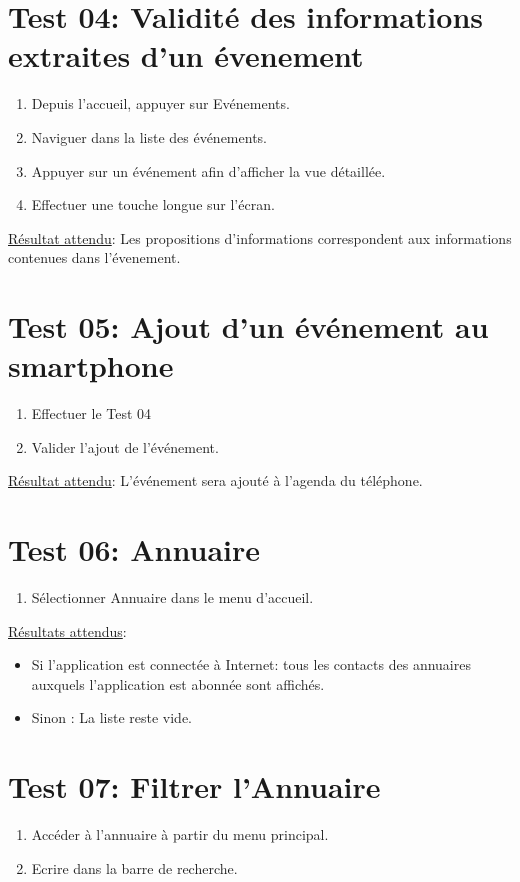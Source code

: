 \documentclass [pdftex,12pt] {report}
\begin{document}
  \section{Test 04: Validité des informations extraites d'un évenement}
    \begin{enumerate}
    \item Depuis l'accueil, appuyer sur Evénements.
    \item Naviguer dans la liste des événements.
    \item Appuyer sur un événement afin d'afficher la vue détaillée.
    \item Effectuer une touche longue sur l'écran.
    \end{enumerate}

    \underline{Résultat attendu}: Les propositions d'informations correspondent aux informations contenues dans l'évenement.

  \section{Test 05: Ajout d'un événement au smartphone}
    \begin{enumerate}
    \item Effectuer le Test 04
    \item Valider l'ajout de l'événement.
    \end{enumerate}

    \underline{Résultat attendu}: L'événement sera ajouté à l'agenda du téléphone.


  \section{Test 06: Annuaire}
    \begin{enumerate}
    \item Sélectionner Annuaire dans le menu d'accueil.
    \end{enumerate}

    \underline{Résultats attendus}:
    \begin{itemize}
    \item Si l'application est connectée à Internet: tous les contacts des annuaires auxquels l'application est abonnée sont affichés.
    \item Sinon : La liste reste vide.
    \end{itemize}

  \section{Test 07: Filtrer l'Annuaire}
    \begin{enumerate}
    \item Accéder à l'annuaire à partir du menu principal.
    \item Ecrire dans la barre de recherche.
    \end{enumerate}
\end{document}
